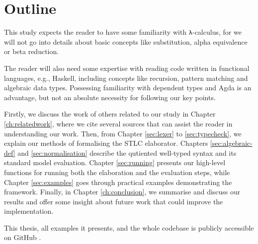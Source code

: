 \chapter{Outline}
\label{ch:outline}

This study expects the reader to have some familiarity with \verb$λ$-calculus, for we will not go into details about basic concepts like substitution, alpha equivalence or beta reduction.

The reader will also need some expertise with reading code written in functional languages, e.g., Haskell, including concepts like recursion, pattern matching and algebraic data types. Possessing familiarity with dependent types and Agda is an advantage, but not an absolute necessity for following our key points.

Firstly, we discuss the work of others related to our study in Chapter \ref{ch:relatedwork}, where we cite several sources that can assist the reader in understanding our work. Then, from Chapter \ref{sec:lexer} to \ref{sec:typecheck}, we explain our methods of formalising the STLC elaborator. Chapters \ref{sec:algebraic-def} and \ref{sec:normalisation} describe the qutiented well-typed syntax and its standard model evaluation. Chapter \ref{sec:running} presents our high-level functions for running both the elaboration and the evaluation steps, while Chapter \ref{sec:examples} goes through practical examples demonstrating the framework. Finally, in Chapter \ref{ch:conclusion}, we summarise and discuss our results and offer some insight about future work that could improve the implementation.

This thesis, all examples it presents, and the whole codebase is publicly accessible on GitHub \cite{home-repo}.


